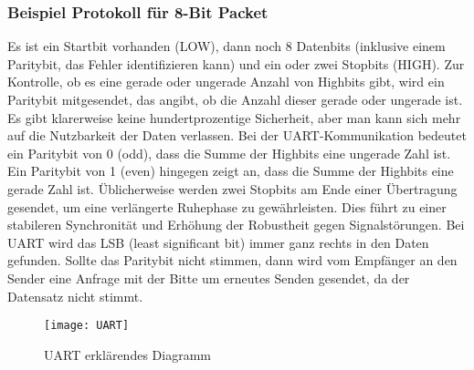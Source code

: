 \documentclass[titlepage,12pt,twoside]{article}
\begin{document}
\subsubsection{Beispiel Protokoll für 8-Bit Packet}
Es ist ein Startbit vorhanden (LOW), dann noch 8 Datenbits (inklusive einem 
Paritybit, das Fehler identifizieren kann) und ein oder zwei Stopbits (HIGH). 
Zur Kontrolle, ob es eine gerade oder ungerade Anzahl von Highbits gibt, wird 
ein Paritybit mitgesendet, das angibt, ob die Anzahl dieser gerade oder ungerade 
ist. Es gibt klarerweise keine hundertprozentige Sicherheit, aber man kann sich 
mehr auf die Nutzbarkeit der Daten verlassen. Bei der UART-Kommunikation bedeutet 
ein Paritybit von 0 (odd), dass die Summe der Highbits eine ungerade Zahl ist. Ein 
Paritybit von 1 (even) hingegen zeigt an, dass die Summe der Highbits eine gerade 
Zahl ist. Üblicherweise werden zwei Stopbits am Ende einer Übertragung gesendet, 
um eine verlängerte Ruhephase zu gewährleisten. 
Dies führt zu einer stabileren Synchronität und Erhöhung der Robustheit gegen 
Signalstörungen. Bei UART wird das LSB (least significant bit) immer ganz rechts 
in den Daten gefunden. Sollte das Paritybit nicht stimmen, dann wird vom 
Empfänger an den Sender eine Anfrage mit der Bitte um erneutes Senden gesendet, 
da der Datensatz nicht stimmt. \\
\begin{figure}[H]
	\begin{center}
		\scalebox{0.5}
		{\texttt{[image: UART]}}
		\caption{UART erklärendes Diagramm}
		\label{fig:UART}		
	\end{center}
\end{figure}
\end{document}
